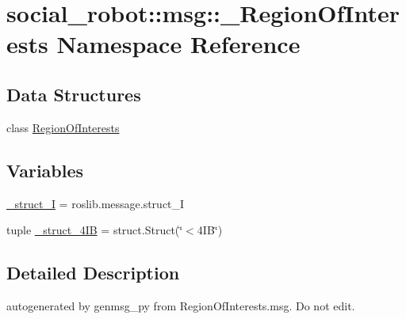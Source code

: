 \hypertarget{namespacesocial__robot_1_1msg_1_1__RegionOfInterests}{
\section{social\_\-robot::msg::\_\-RegionOfInterests Namespace Reference}
\label{namespacesocial__robot_1_1msg_1_1__RegionOfInterests}
}
\subsection*{Data Structures}
\begin{DoxyCompactItemize}
\item 
class \hyperlink{classsocial__robot_1_1msg_1_1__RegionOfInterests_1_1RegionOfInterests}{RegionOfInterests}
\end{DoxyCompactItemize}
\subsection*{Variables}
\begin{DoxyCompactItemize}
\item 
\hyperlink{namespacesocial__robot_1_1msg_1_1__RegionOfInterests_a91eac5ebdf4bad3a971f7f52b1e9c46d}{\_\-struct\_\-I} = roslib.message.struct\_\-I
\item 
tuple \hyperlink{namespacesocial__robot_1_1msg_1_1__RegionOfInterests_a29a8848fda8944f0f05bda2d5f4e5d9e}{\_\-struct\_\-4IB} = struct.Struct(\char`\"{}$<$4IB\char`\"{})
\end{DoxyCompactItemize}


\subsection{Detailed Description}
\begin{DoxyVerb}autogenerated by genmsg_py from RegionOfInterests.msg. Do not edit.\end{DoxyVerb}
 

